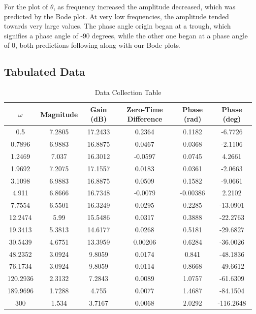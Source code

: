 For the plot of $\theta$, as frequency increased the amplitude decreased, which was predicted by the Bode plot. At very low frequencies, the amplitude tended towards very large values. The phase angle origin began at a trough, which signifies a phase angle of -90 degrees, while the other one began at a phase angle of 0, both predictions following along with our Bode plots.  

\subsection{Tabulated Data}

\begin{table}[H]
	\centering
	\caption{Data Collection Table}
	\label{tab:data-collection}
	\begin{tabular}{|| c c c c c c ||}
		\hline
		$\omega$ & Magnitude & Gain (dB) & Zero-Time Difference & Phase (rad) & Phase (deg) \\ [0.5ex]
		\hline\hline
		0.5 & 7.2805 & 17.2433 & 0.2364 & 0.1182 & -6.7726 \\
		\hline
		0.7896 & 6.9883 & 16.8875 & 0.0467 & 0.0368 & -2.1106 \\
		\hline 
		1.2469 & 7.037 & 16.3012 & -0.0597 & 0.0745 & 4.2661 \\
		\hline 
		1.9692 & 7.2075 & 17.1557 & 0.0183 & 0.0361 & -2.0663 \\
		\hline
		3.1098 & 6.9883 & 16.8875 & 0.0509 & 0.1582 & -9.0661 \\
		\hline
		4.911 & 6.8666 & 16.7348 & -0.0079 & -0.00386 & 2.2102 \\
		\hline 
		7.7554 & 6.5501 & 16.3249 & 0.0295 & 0.2285 & -13.0901 \\
		\hline 
		12.2474 & 5.99 & 15.5486 & 0.0317 & 0.3888 & -22.2763 \\
		\hline 
		19.3413 & 5.3813 & 14.6177 & 0.0268 & 0.5181 & -29.6827 \\
		\hline 
		30.5439 & 4.6751 & 13.3959 & 0.00206 & 0.6284 & -36.0026 \\
		\hline 
		48.2352 & 3.0924 & 9.8059 & 0.0174 & 0.841 & -48.1836 \\
		\hline 
		76.1734 & 3.0924 & 9.8059 & 0.0114 & 0.8668 & -49.6612 \\
		\hline 
		120.2936 & 2.3132 & 7.2843 & 0.0089 & 1.0757 & -61.6309 \\
		\hline 
		189.9696 & 1.7288 & 4.755 & 0.0077 & 1.4687 & -84.1504 \\
		\hline 
		300 & 1.534 & 3.7167 & 0.0068 & 2.0292 & -116.2648 \\
		\hline 
	\end{tabular}
\end{table}

